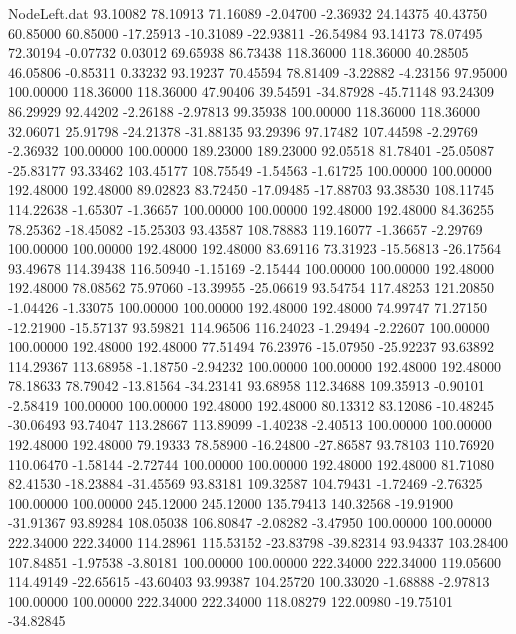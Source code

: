 \begin{filecontents}{NodeLeft.dat}
  93.10082   78.10913   71.16089    -2.04700   -2.36932   24.14375   40.43750   60.85000   60.85000  -17.25913  -10.31089  -22.93811  -26.54984
  93.14173   78.07495   72.30194    -0.07732    0.03012   69.65938   86.73438  118.36000  118.36000   40.28505   46.05806   -0.85311    0.33232
  93.19237   70.45594   78.81409    -3.22882   -4.23156   97.95000  100.00000  118.36000  118.36000   47.90406   39.54591  -34.87928  -45.71148
  93.24309   86.29929   92.44202    -2.26188   -2.97813   99.35938  100.00000  118.36000  118.36000   32.06071   25.91798  -24.21378  -31.88135
  93.29396   97.17482  107.44598    -2.29769   -2.36932  100.00000  100.00000  189.23000  189.23000   92.05518   81.78401  -25.05087  -25.83177
  93.33462  103.45177  108.75549    -1.54563   -1.61725  100.00000  100.00000  192.48000  192.48000   89.02823   83.72450  -17.09485  -17.88703
  93.38530  108.11745  114.22638    -1.65307   -1.36657  100.00000  100.00000  192.48000  192.48000   84.36255   78.25362  -18.45082  -15.25303
  93.43587  108.78883  119.16077    -1.36657   -2.29769  100.00000  100.00000  192.48000  192.48000   83.69116   73.31923  -15.56813  -26.17564
  93.49678  114.39438  116.50940    -1.15169   -2.15444  100.00000  100.00000  192.48000  192.48000   78.08562   75.97060  -13.39955  -25.06619
  93.54754  117.48253  121.20850    -1.04426   -1.33075  100.00000  100.00000  192.48000  192.48000   74.99747   71.27150  -12.21900  -15.57137
  93.59821  114.96506  116.24023    -1.29494   -2.22607  100.00000  100.00000  192.48000  192.48000   77.51494   76.23976  -15.07950  -25.92237
  93.63892  114.29367  113.68958    -1.18750   -2.94232  100.00000  100.00000  192.48000  192.48000   78.18633   78.79042  -13.81564  -34.23141
  93.68958  112.34688  109.35913    -0.90101   -2.58419  100.00000  100.00000  192.48000  192.48000   80.13312   83.12086  -10.48245  -30.06493
  93.74047  113.28667  113.89099    -1.40238   -2.40513  100.00000  100.00000  192.48000  192.48000   79.19333   78.58900  -16.24800  -27.86587
  93.78103  110.76920  110.06470    -1.58144   -2.72744  100.00000  100.00000  192.48000  192.48000   81.71080   82.41530  -18.23884  -31.45569
  93.83181  109.32587  104.79431    -1.72469   -2.76325  100.00000  100.00000  245.12000  245.12000  135.79413  140.32568  -19.91900  -31.91367
  93.89284  108.05038  106.80847    -2.08282   -3.47950  100.00000  100.00000  222.34000  222.34000  114.28961  115.53152  -23.83798  -39.82314
  93.94337  103.28400  107.84851    -1.97538   -3.80181  100.00000  100.00000  222.34000  222.34000  119.05600  114.49149  -22.65615  -43.60403
  93.99387  104.25720  100.33020    -1.68888   -2.97813  100.00000  100.00000  222.34000  222.34000  118.08279  122.00980  -19.75101  -34.82845

\end{filecontents}
